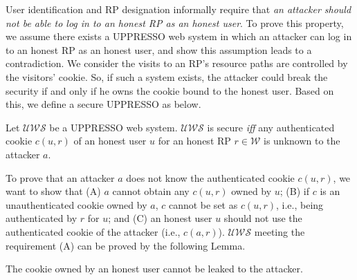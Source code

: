 User identification and RP designation informally require that {\em an attacker should not be able to log in to an honest RP as an honest user}. To prove this property, we assume there exists a UPPRESSO web system in which an attacker can log in to an honest RP as an honest user, and show this assumption leads to a contradiction. We consider the visits to an RP's resource paths are controlled by the visitors' cookie. So, if such a system exists, the attacker could break the security if and only if he owns the cookie bound to the honest user. %
Based on this, we define a secure UPPRESSO as below.
\begin{definition}
Let $\mathcal{UWS}$ be a UPPRESSO web system. $\mathcal{UWS}$ is secure {\em iff} any authenticated cookie $c(u,r)$ of an honest user $u$ for an honest RP $r \in \mathcal{W}$ is unknown to the attacker $a$.
\label{def:secure}
\end{definition}
\vspace{-\topsep}
To prove that an attacker $a$ does not know the authenticated cookie $c(u,r)$, we want to show that (A) $a$ cannot obtain any $c(u,r)$ owned by $u$; (B) if $c$ is an unauthenticated cookie owned by $a$, $c$ cannot be set as $c(u,r)$, i.e., being authenticated by $r$ for $u$; and (C) an honest user $u$ should not use the authenticated cookie of the attacker (i.e., $c(a,r)$). $\mathcal{UWS}$ meeting the requirement (A) can be proved by the following Lemma.
\begin{lemma}
The cookie owned by an honest user cannot be leaked to the attacker.
\label{lemma:cookie}
\end{lemma}
\vspace{-\topsep}
